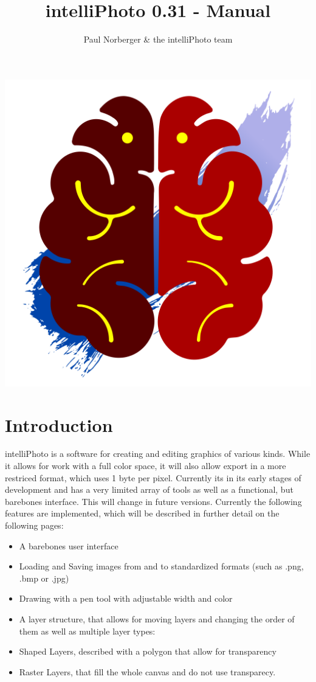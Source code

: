 \documentclass[a4paper, 12pt]{article}
\title{intelliPhoto 0.31 - Manual}
\author{Paul Norberger \& the intelliPhoto team}
\begin{document}
\begin{titlepage}
\maketitle
\thispagestyle{empty}
\begin{center}
\includegraphics[width=0.35\linewidth,keepaspectratio]{assets/icon}
\end{center}
\tableofcontents
\end{titlepage}
\section{Introduction}
intelliPhoto is a software for creating and editing graphics of various kinds. While it allows for work with a full color space, it will also allow export in a more restriced format, which uses 1 byte per pixel. Currently its in its early stages of development and has a very limited array of tools as well as a functional, but barebones interface. This will change in future versions.
Currently the following features are implemented, which will be described in further detail on the following pages:
\begin{itemize}
\item A barebones user interface
\item Loading and Saving images from and to standardized formats (such as .png, .bmp or .jpg)
\item Drawing with a pen tool with adjustable width and color
\item A layer structure, that allows for moving layers and changing the order of them as well as multiple layer types:
\item Shaped Layers, described with a polygon that allow for transparency
\item Raster Layers, that fill the whole canvas and do not use transparecy.
\end{itemize}
\end{document}
